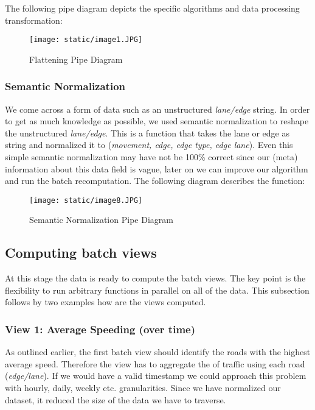 \documentclass[format=acmsmall, review=false, screen=true]{acmart}
\begin{document}
The following pipe diagram depicts the specific algorithms and data processing transformation:

\begin{figure}[H]
  \texttt{[image: static/image1.JPG]}
  \caption{Flattening Pipe Diagram}
  \label{fig:verticalpartitioning-diagram}
\end{figure}

\subsubsection{Semantic Normalization}
We come across a form of data such as an unstructured \textit{lane/edge} string. In order to get as much knowledge as possible, we used semantic normalization to reshape the unstructured \textit{lane/edge}. This is a function that takes the lane or edge as string and normalized it to (\textit{movement, edge, edge type, edge lane}). Even this simple semantic normalization may have not be 100\% correct since our (meta) information about this data field is vague, later on we can improve our algorithm and run the batch recomputation. The following diagram describes the function:

\begin{figure}[H]
  \texttt{[image: static/image8.JPG]}
  \caption{Semantic Normalization Pipe Diagram}
  \label{fig:verticalpartitioning-diagram}
\end{figure}

\subsection{Computing batch views}

At this stage the data is ready to compute the batch views. The key point is the flexibility to run arbitrary functions in parallel on all of the data. This subsection follows by two examples how are the views computed.

\subsubsection{View 1: Average Speeding (over time)}
As outlined earlier, the first batch view should identify the roads with the highest average speed. Therefore the view has to aggregate the  of traffic using each road (\textit{edge/lane}). If we would have a valid timestamp we could approach this problem with hourly, daily, weekly etc. granularities. Since we have normalized our dataset, it reduced the size of the data we have to traverse.
\end{document}
